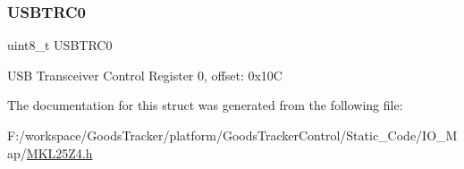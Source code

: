 \subsubsection{\texorpdfstring{U\+S\+B\+T\+R\+C0}{USBTRC0}}
{\footnotesize\ttfamily uint8\+\_\+t U\+S\+B\+T\+R\+C0}

U\+SB Transceiver Control Register 0, offset\+: 0x10C 

The documentation for this struct was generated from the following file\+:\begin{DoxyCompactItemize}
\item 
F\+:/workspace/\+Goods\+Tracker/platform/\+Goods\+Tracker\+Control/\+Static\+\_\+\+Code/\+I\+O\+\_\+\+Map/\hyperlink{_m_k_l25_z4_8h}{M\+K\+L25\+Z4.\+h}\end{DoxyCompactItemize}

